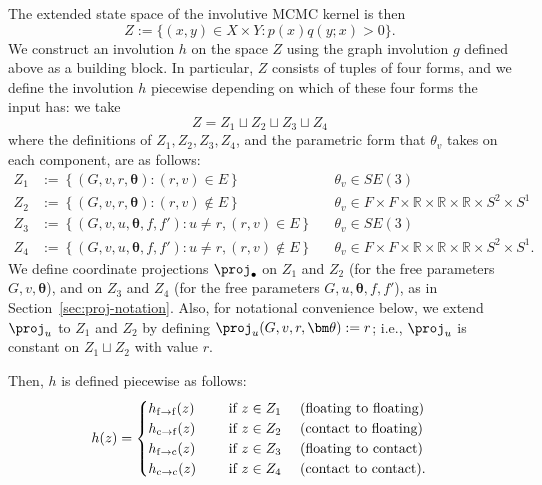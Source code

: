 The extended state space of the involutive MCMC kernel is then
\begin{equation}
Z := \{(x, y) \in X \times Y : p(x) q(y; x) > 0\}.
\end{equation}
We construct an involution $h$ on the space $Z$ using the graph involution $g$ defined above as a building block.
In particular, $Z$ consists of tuples of four forms, and we define the involution $h$ piecewise depending on which of these four forms the input has: we take
\[
    Z = Z_1 \sqcup Z_2 \sqcup Z_3 \sqcup Z_4
\]
where the definitions of $Z_1, Z_2, Z_3, Z_4$, and the parametric form that $\theta_v$ takes on each component, are as follows:
\begin{align*}
    Z_1 &:= \left\{ (G, v, r, \bm{\theta}) : (r, v) \in E \right\} && \theta_v \in SE(3) \\
    Z_2 &:= \left\{ (G, v, r, \bm{\theta}) : (r, v) \notin E \right\} && \theta_v \in F \times F \times \mathbb{R} \times \mathbb{R} \times \mathbb{R} \times S^2 \times S^1 \\
    Z_3 &:= \left\{ (G, v, u, \bm{\theta}, f, f') : u \neq r, (r, v) \in E \right\} && \theta_v \in SE(3) \\
    Z_4 &:= \left\{ (G, v, u, \bm{\theta}, f, f') : u \neq r, (r, v) \notin E \right\} && \theta_v \in F \times F \times \mathbb{R} \times \mathbb{R} \times \mathbb{R} \times S^2 \times S^1.
\end{align*}
We define coordinate projections $\proj_\bullet$ on $Z_1$ and $Z_2$ (for the free parameters $G, v, \bm\theta$), and on $Z_3$ and $Z_4$ (for the free parameters $G, u, \bm\theta, f, f'$), as in Section~\ref{sec:proj-notation}.
Also, for notational convenience below, we extend $\proj_u$ to $Z_1$ and $Z_2$ by defining $\proj_u(G,v,r,\bm\theta) := r$; i.e., $\proj_u$ is constant on $Z_1 \sqcup Z_2$ with value $r$.

Then, $h$ is defined piecewise as follows:
\begin{equation}
h(z) = \begin{cases}
    h_{\mathrm{f} \to \mathrm{f}}(z) &\quad\text{ if $z \in Z_1$ \quad (floating to floating)} \\
    h_{\mathrm{c} \to \mathrm{f}}(z) &\quad\text{ if $z \in Z_2$ \quad (contact to floating)} \\
    h_{\mathrm{f} \to \mathrm{c}}(z) &\quad\text{ if $z \in Z_3$ \quad (floating to contact)} \\
    h_{\mathrm{c} \to \mathrm{c}}(z) &\quad\text{ if $z \in Z_4$ \quad (contact to contact).}
\end{cases}
\end{equation}

